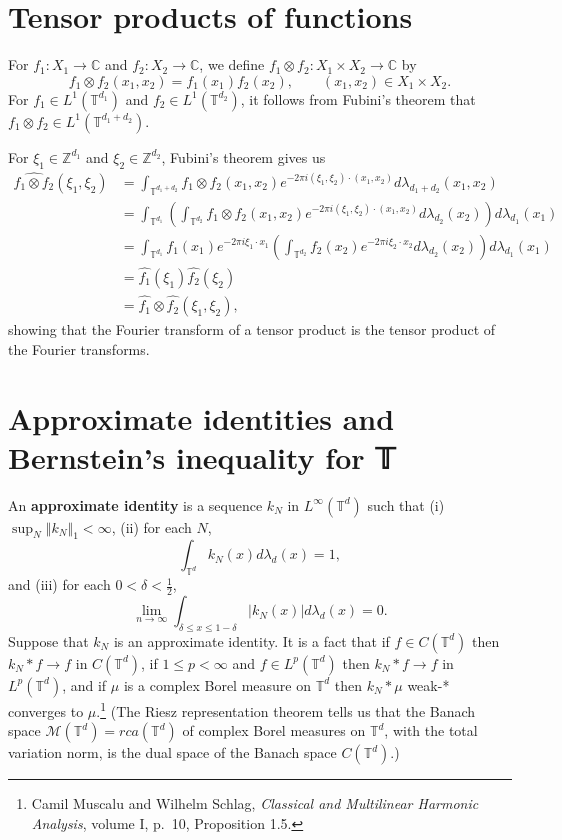 \documentclass{article}
\newcommand{\norm}[1]{\left\Vert #1 \right\Vert}
\theoremstyle{definition}
\begin{document}
\section{Tensor products of functions}
For $f_1:X_1 \to \mathbb{C}$ and $f_2:X_2 \to \mathbb{C}$, we define
$f_1 \otimes f_2:X_1 \times X_2 \to \mathbb{C}$ by
\[
f_1 \otimes f_2(x_1,x_2) = f_1(x_1)f_2(x_2), \qquad (x_1,x_2) \in X_1 \times X_2.
\]
For $f_1 \in L^1(\mathbb{T}^{d_1})$ and $f_2 \in L^1(\mathbb{T}^{d_2})$, it follows from Fubini's theorem that
$f_1 \otimes f_2 \in L^1(\mathbb{T}^{d_1+d_2})$. 

For $\xi_1 \in \mathbb{Z}^{d_1}$ and $\xi_2 \in \mathbb{Z}^{d_2}$, Fubini's theorem gives us
\begin{align*}
\widehat{f_1 \otimes f_2}(\xi_1,\xi_2)&=\int_{\mathbb{T}^{d_1+d_2}} f_1 \otimes f_2 (x_1,x_2) e^{-2\pi i(\xi_1,\xi_2)\cdot (x_1,x_2)} d\lambda_{d_1+d_2}(x_1,x_2)\\
&=\int_{\mathbb{T}^{d_1}} \left( \int_{\mathbb{T}^{d_2}}  f_1 \otimes f_2 (x_1,x_2) e^{-2\pi i(\xi_1,\xi_2)\cdot (x_1,x_2)} d\lambda_{d_2}(x_2) \right) d\lambda_{d_1}(x_1)\\
&=\int_{\mathbb{T}^{d_1}} f_1(x_1) e^{-2\pi i\xi_1 \cdot x_1} \left( \int_{\mathbb{T}^{d_2}} f_2(x_2) e^{-2\pi i\xi_2 \cdot x_2} d\lambda_{d_2}(x_2) \right)
d\lambda_{d_1}(x_1)\\
&=\hat{f_1}(\xi_1) \hat{f_2}(\xi_2)\\
&=\hat{f_1} \otimes \hat{f_2}(\xi_1,\xi_2),
\end{align*}
showing that the Fourier transform of a tensor product is the tensor product of the Fourier transforms.




\section{Approximate identities and Bernstein's inequality  for 𝕋}
An \textbf{approximate identity} is a sequence $k_N$ in $L^\infty(\mathbb{T}^d)$ such that
(i) $\sup_N \norm{k_N}_1 < \infty$,  (ii) for each $N$,
\[
\int_{\mathbb{T}^d} k_N(x) d\lambda_d(x)=1,
\]
and 
(iii) for each $0<\delta<\frac{1}{2}$,
\[
\lim_{n \to \infty} \int_{\delta\leq x \leq 1-\delta} |k_N(x)| d\lambda_d(x)=0.
\]
Suppose that $k_N$ is an approximate identity.
It is a fact that if $f \in C(\mathbb{T}^d)$ then $k_N * f \to f$ in $C(\mathbb{T}^d)$,
if $1 \leq p < \infty$ and $f \in L^p(\mathbb{T}^d)$ then
$k_N*f \to f$ in $L^p(\mathbb{T}^d)$, and if $\mu$ is a complex Borel measure on $\mathbb{T}^d$ then
$k_N * \mu$ weak-* converges to $\mu$.\footnote{Camil Muscalu and Wilhelm Schlag, {\em Classical and Multilinear Harmonic
Analysis}, volume I, p.~10, Proposition 1.5.} (The Riesz representation theorem tells us that the 
Banach space $\mathcal{M}(\mathbb{T}^d)=rca(\mathbb{T}^d)$ of complex Borel measures on $\mathbb{T}^d$, with the total variation norm, is the dual space
of the Banach space $C(\mathbb{T}^d)$.)
\end{document}

